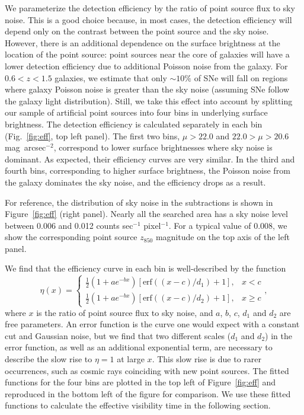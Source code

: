 We parameterize the detection efficiency by the ratio of point source
flux to sky noise. This is a good choice because, in most cases, the
detection efficiency will depend only on the contrast between the
point source and the sky noise. However, there is an additional
dependence on the surface brightness at the location of the point
source: point sources near the core of galaxies will have a lower
detection efficiency due to additional Poisson noise from the
galaxy. For $0.6<z<1.5$ galaxies, we estimate that only $\sim$$10\%$
of SNe will fall on regions where galaxy Poisson noise is greater than
the sky noise (assuming SNe follow the galaxy light
distribution). Still, we take this effect into account by splitting
our sample of artificial point sources into four bins in underlying
surface brightness. The detection efficiency is calculated separately
in each bin (Fig.~\ref{fig:eff}, top left panel).  The first two bins,
$\mu > 22.0$ and $22.0 > \mu > 20.6$ mag~arcsec$^{-2}$, correspond to
lower surface brightnesses where sky noise is dominant. As expected,
their efficiency curves are very similar. In the third and fourth
bins, corresponding to higher surface brightness, the Poisson noise
from the galaxy dominates the sky noise, and the efficiency drops as a
result.

For reference, the distribution of sky noise in the subtractions is
shown in Figure~\ref{fig:eff} (right panel). Nearly all the searched
area has a sky noise level between 0.006 and
0.012 counts sec$^{-1}$ pixel$^{-1}$. For a typical value of 0.008, we
show the corresponding point source $z_{850}$ magnitude on the top
axis of the left panel.

We find that the efficiency curve in each bin is well-described by
the function
\begin{equation}
\eta(x) = \left\{ \begin{array}{ll}
\frac{1}{2} (1+ae^{-bx}) [\mathrm{erf}((x-c)/d_1)+1], & x<c     \\
\frac{1}{2} (1+ae^{-bx}) [\mathrm{erf}((x-c)/d_2)+1], & x \ge c
\end{array} \right. ,
\end{equation}
where $x$ is the ratio of point source flux to sky noise, and $a$,
$b$, $c$, $d_1$ and $d_2$ are free parameters. An error function is
the curve one would expect with a constant cut and Gaussian noise, but
we find that two different scales ($d_1$ and $d_2$) in the error
function, as well as an additional exponential term, are necessary to
describe the slow rise to $\eta =1$ at large $x$. This slow rise is
due to rarer occurrences, such as cosmic rays coinciding with new point
sources. The fitted functions for the four bins are plotted in the top
left of Figure~\ref{fig:eff} and reproduced in the bottom left of the
figure for comparison. We use these fitted functions to calculate the
effective visibility time in the following section. 
